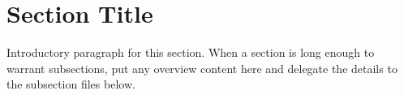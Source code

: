 \section{Section Title}
\label{sec:N_SECTION_2}

Introductory paragraph for this section. When a section is long enough to warrant subsections,
put any overview content here and delegate the details to the subsection files below.




